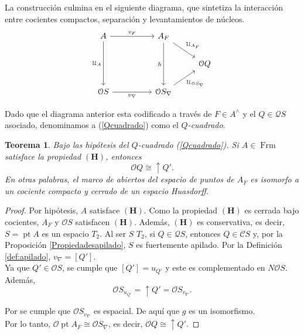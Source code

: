 \documentclass[11pt]{amsart}
\DeclareMathOperator{\pt}{pt}
\DeclareMathOperator{\Frm}{Frm}
\theoremstyle{plain}
\newtheorem{thm}{Teorema}[section]
\theoremstyle{definition}
\begin{document}
La construcción culmina en el siguiente diagrama, que sintetiza la interacción entre cocientes compactos, separación y levantamientos de núcleos.
\begin{equation}\label{Qcuadrado}
\begin{tikzcd}
	A && {A_F} & \\
	&&& {\mathcal{O}Q} \\
	{\mathcal{O}S} && {\mathcal{O}S_\nabla}
	\arrow["{v_F}", from=1-1, to=1-3]
	\arrow["{\mathcal{U}_A}"', from=1-1, to=3-1]
	\arrow["{\mathcal{U}_{A_F}}", from=1-3, to=2-4]
	\arrow["h"', from=1-3, to=3-3]
	\arrow["{v_\nabla}"', from=3-1, to=3-3]
	\arrow["{\mathcal{U}_{\mathcal{O}S_\nabla}}"', from=3-3, to=2-4]
\end{tikzcd}\end{equation}

Dado que el diagrama anterior esta codificado a través de $F\in A^\wedge$ y el $Q\in \mathcal{Q}S$ asociado, 
denominamos a (\ref{Qcuadrado}) como el \emph{$Q$-cuadrado}.

\begin{thm}\label{haus1}
Bajo las hipótesis del $Q$-cuadrado (\ref{Qcuadrado}). Si $A\in \Frm$ satisface la propiedad $\mathbf{(H)}$, entonces
\[
\mathcal{O}Q\cong \uparrow Q'.
\]
En otras palabras, el marco de abiertos del espacio de puntos de $A_F$ es isomorfo a un cociente compacto
y cerrado de un espacio Huasdorff.
\end{thm}

\begin{proof}
Por hipótesis, $A$ satisface $\mathbf{(H)}$. Como la propiedad $\mathbf{(H)}$ es cerrada bajo cocientes, $A_F$ y $\mathcal{O}S$ satisfacen $\mathbf{(H)}$.
Además, $\mathbf{(H)}$ es conservativa, es decir, $S=\pt A$ es un espacio $T_2$. Al ser $S$ $T_2$, si $Q\in \mathcal{Q}S$, entonces $Q\in \mathcal{C}S$ y, por la Proposición \ref{Propiedadesapilado}, $S$ 
es fuertemente apilado. Por la Definición \ref{def:apilado}, $v_\nabla=[Q']$.\\

Ya que $Q'\in \mathcal{O}S$, se cumple que $[Q']=u_{Q'}$ y este es complementado en $N\mathcal{O}S$. Además,
\[
\mathcal{O}S_{u_{Q'}}=\uparrow Q'=\mathcal{O}S_{v_\nabla}.
\]

Por \cite[Propocisión VI.3.3]{PicadoPultr} se cumple que $\mathcal{O}S_{v_\nabla}$ es espacial. De aquí que $g$ es un isomorfismo.\\

Por lo tanto, $\mathcal{O}\pt A_F\cong \mathcal{O}S_\nabla$, es decir, $\mathcal{O}Q\cong \uparrow Q'$.

\end{proof}
\end{document}
